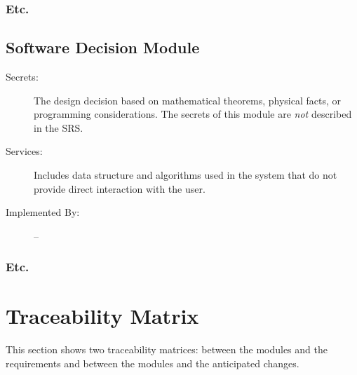 \documentclass[12pt, titlepage]{article}
\begin{document}
\subsubsection{Etc.}


\subsection{Software Decision Module}

\begin{description}
\item[Secrets:] The design decision based on mathematical theorems, physical
  facts, or programming considerations. The secrets of this module are
  \emph{not} described in the SRS.
\item[Services:] Includes data structure and algorithms used in the system that
  do not provide direct interaction with the user. 
\item[Implemented By:] --
\end{description}

\subsubsection{Etc.}

\section{Traceability Matrix} \label{SecTM}

This section shows two traceability matrices: between the modules and the
requirements and between the modules and the anticipated changes.
\end{document}
